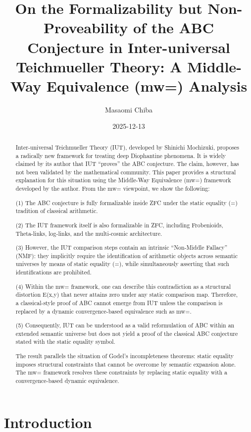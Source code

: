 \documentclass[11pt]{article}
\title{On the Formalizability but Non-Proveability of the ABC Conjecture in Inter-universal Teichmueller Theory: A Middle-Way Equivalence (mw=) Analysis}
\author{Masaomi Chiba}
\date{2025-12-13}
\begin{document}
\maketitle

\begin{abstract}
Inter-universal Teichmueller Theory (IUT), developed by Shinichi Mochizuki, 
proposes a radically new framework for treating deep Diophantine phenomena.
It is widely claimed by its author that IUT ``proves'' the ABC conjecture.
The claim, however, has not been validated by the mathematical community.
This paper provides a structural explanation for this situation using the
Middle-Way Equivalence (mw=) framework developed by the author.
From the mw= viewpoint, we show the following:

(1) The ABC conjecture is fully formalizable inside ZFC under the static
equality (=) tradition of classical arithmetic.

(2) The IUT framework itself is also formalizable in ZFC, including
Frobenioids, Theta-links, log-links, and the multi-cosmic architecture.

(3) However, the IUT comparison steps contain an intrinsic ``Non-Middle
Fallacy'' (NMF): they implicitly require the identification of arithmetic
objects across semantic universes by means of static equality (=), while
simultaneously asserting that such identifications are prohibited.

(4) Within the mw= framework, one can describe this contradiction as a
structural distortion E(x,y) that never attains zero under any static
comparison map. Therefore, a classical-style proof of ABC cannot emerge
from IUT unless the comparison is replaced by a dynamic convergence-based
equivalence such as mw=. 

(5) Consequently, IUT can be understood as a valid reformulation of ABC
within an extended semantic universe but does not yield a proof of the
classical ABC conjecture stated with the static equality symbol.

The result parallels the situation of Godel's incompleteness theorems:
static equality imposes structural constraints that cannot be overcome
by semantic expansion alone. The mw= framework resolves these constraints
by replacing static equality with a convergence-based dynamic equivalence.

\end{abstract}

\section{Introduction}
\end{document}

